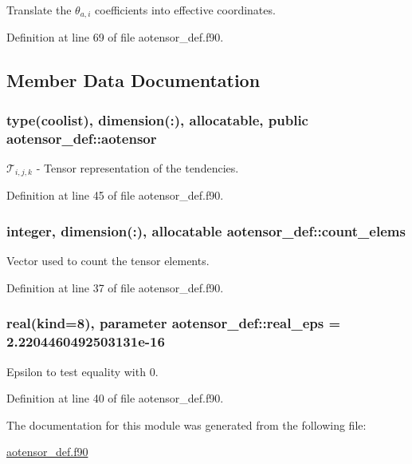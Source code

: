 Translate the $\theta_{a,i}$ coefficients into effective coordinates. 



Definition at line 69 of file aotensor\-\_\-def.\-f90.



\subsection{Member Data Documentation}
\hypertarget{classaotensor__def_a0dc43bc9294a18f2fe57b67489f1702f}{
\subsubsection[{aotensor}]{\setlength{\rightskip}{0pt plus 5cm}type(coolist), dimension(\-:), allocatable, public aotensor\-\_\-def\-::aotensor}}\label{classaotensor__def_a0dc43bc9294a18f2fe57b67489f1702f}


$\mathcal{T}_{i,j,k}$ -\/ Tensor representation of the tendencies. 



Definition at line 45 of file aotensor\-\_\-def.\-f90.

\hypertarget{classaotensor__def_aa9e30c84efc5a81409ba9c0286c87eac}{
\subsubsection[{count\-\_\-elems}]{\setlength{\rightskip}{0pt plus 5cm}integer, dimension(\-:), allocatable aotensor\-\_\-def\-::count\-\_\-elems\hspace{0.3cm}{\ttfamily [private]}}}\label{classaotensor__def_aa9e30c84efc5a81409ba9c0286c87eac}


Vector used to count the tensor elements. 



Definition at line 37 of file aotensor\-\_\-def.\-f90.

\hypertarget{classaotensor__def_ab1cf9313fb1def1a17de539cfa922e35}{
\subsubsection[{real\-\_\-eps}]{\setlength{\rightskip}{0pt plus 5cm}real(kind=8), parameter aotensor\-\_\-def\-::real\-\_\-eps = 2.\-2204460492503131e-\/16\hspace{0.3cm}{\ttfamily [private]}}}\label{classaotensor__def_ab1cf9313fb1def1a17de539cfa922e35}


Epsilon to test equality with 0. 



Definition at line 40 of file aotensor\-\_\-def.\-f90.



The documentation for this module was generated from the following file\-:\begin{DoxyCompactItemize}
\item 
\hyperlink{aotensor__def_8f90}{aotensor\-\_\-def.\-f90}\end{DoxyCompactItemize}
